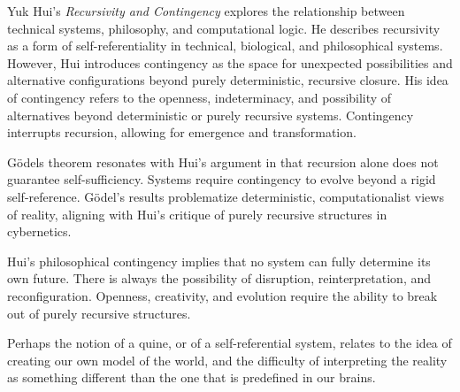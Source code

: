Yuk Hui's \textit{Recursivity and Contingency} \citep{Hui2019} explores the relationship between technical systems, philosophy, and computational logic. He describes recursivity as a form of self-referentiality in technical, biological, and philosophical systems. However, Hui introduces contingency as the space for unexpected possibilities and alternative configurations beyond purely deterministic, recursive closure. His idea of contingency refers to the openness, indeterminacy, and possibility of alternatives beyond deterministic or purely recursive systems. Contingency interrupts recursion, allowing for emergence and transformation.

Gödels theorem resonates with Hui's argument in that recursion alone does not guarantee self-sufficiency. Systems require contingency to evolve beyond a rigid self-reference. Gödel's results problematize deterministic, computationalist views of reality, aligning with Hui's critique of purely recursive structures in cybernetics.

Hui's philosophical contingency implies that no system can fully determine its own future. There is always the possibility of disruption, reinterpretation, and reconfiguration. Openness, creativity, and evolution require the ability to break out of purely recursive structures.

Perhaps the notion of a quine, or of a self-referential system, relates to the idea of creating our own model of the world, and the difficulty of interpreting the reality as something different than the one that is predefined in our brains. 

\footnotesize 
\begin{tcolorbox}[colback=gray!20, colframe=black, arc=2mm, boxrule=0.8pt]
\end{tcolorbox}
\normalsize